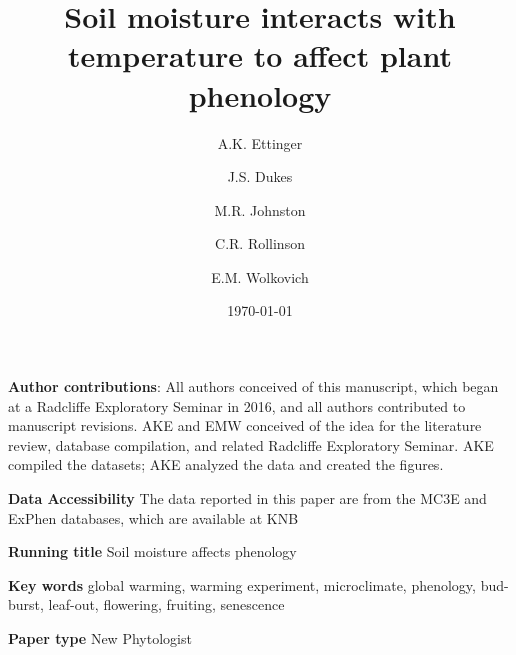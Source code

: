 \documentclass{article}
\begin{document}



\title{Soil moisture interacts with temperature to affect plant phenology} %
\author[1,2,a]{A.K. Ettinger}
\author[3,b]{J.S. Dukes}
\author[4,c]{M.R. Johnston}
\author[5,d]{C.R. Rollinson}
\author[1,4,6,e]{E.M. Wolkovich}









\date{\today}
\maketitle %
\textbf{Author contributions}: All authors conceived of this manuscript, which began at a Radcliffe Exploratory Seminar in 2016, and all authors contributed to manuscript revisions. AKE and EMW conceived of the idea for the literature review, database compilation, and related Radcliffe Exploratory Seminar. AKE compiled the datasets; AKE analyzed the data and created the figures.

\textbf{Data Accessibility} 
The data reported in this paper are from the MC3E and ExPhen databases, which are available at KNB \citep{ettinger2018,ettinger2021}

\textbf{Running title} Soil moisture affects phenology

\textbf{Key words} global warming, warming experiment, microclimate, phenology, bud-burst, leaf-out, flowering, fruiting, senescence 


\textbf{Paper type} New Phytologist
\end{document}
